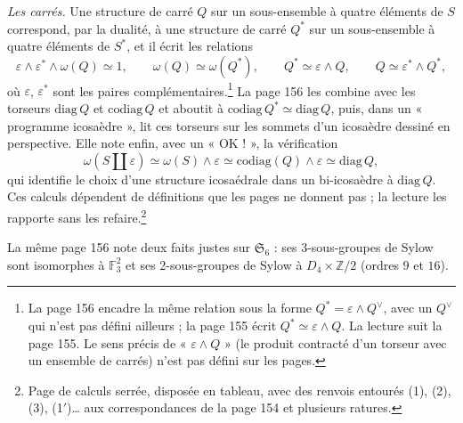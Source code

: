 \documentclass[11pt,a4paper]{article}
\begin{document}
\emph{Les carrés.} Une structure de carré $Q$ sur un sous-ensemble à quatre
éléments de $S$ correspond, par la dualité, à une structure de carré $Q^*$
sur un sous-ensemble à quatre éléments de $S^*$, et il écrit les relations
\[
  \varepsilon \wedge \varepsilon^* \wedge \omega(Q) \simeq 1, \qquad
  \omega(Q) \simeq \omega(Q^*), \qquad
  Q^* \simeq \varepsilon \wedge Q, \qquad Q \simeq \varepsilon^* \wedge Q^*,
\]
où $\varepsilon$, $\varepsilon^*$ sont les paires complémentaires.\footnote{La
page 156 encadre la même relation sous la forme $Q^* = \varepsilon \wedge
Q^{\vee}$, avec un $Q^{\vee}$ qui n'est pas défini ailleurs ; la page 155
écrit $Q^* \simeq \varepsilon \wedge Q$. La lecture suit la page 155. Le sens
précis de « $\varepsilon \wedge Q$ » (le produit contracté d'un torseur avec un
ensemble de carrés) n'est pas défini sur les pages.} La page 156 les combine
avec les torseurs $\mathrm{diag}\,Q$ et $\mathrm{codiag}\,Q$ et aboutit à
$\mathrm{codiag}\,Q^* \simeq \mathrm{diag}\,Q$, puis, dans un « programme
icosaèdre », lit ces torseurs sur les sommets d'un icosaèdre dessiné en
perspective. Elle note enfin, avec un « OK ! », la vérification
\[
  \omega(S \amalg \varepsilon) \simeq \omega(S) \wedge \varepsilon
  \simeq \mathrm{codiag}(Q) \wedge \varepsilon \simeq \mathrm{diag}\,Q,
\]
qui identifie le choix d'une structure icosaédrale dans un bi-icosaèdre à
$\mathrm{diag}\,Q$. Ces calculs dépendent de définitions que les pages ne
donnent pas ; la lecture les rapporte sans les refaire.\footnote{Page de
calculs serrée, disposée en tableau, avec des renvois entourés (1), (2),
(3), (1$'$)\ldots{} aux correspondances de la page 154 et plusieurs
ratures.}

La même page 156 note deux faits justes sur $\mathfrak{S}_6$ : ses 3-sous-groupes
de Sylow sont isomorphes à $\mathbb{F}_3^2$ et ses 2-sous-groupes de Sylow à
$D_4 \times \mathbb{Z}/2$ (ordres $9$ et $16$).
\end{document}
